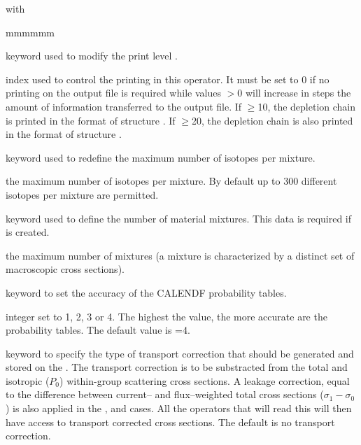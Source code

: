 \noindent
with
\begin{ListeDeDescription}{mmmmmm}

\item[\moc{EDIT}] keyword used to modify the print level .

\item[\dusa{iprint}] index used to control the printing in this operator. It
must be set to 0 if no printing on the output file is required while values
$>$0 will increase in steps the amount of information transferred to the output
file. If $\ge$10, the depletion chain is printed in the format of
structure . If $\ge$20, the depletion chain is also
printed in the format of structure .

\item[\moc{MXIS}] keyword used to redefine the maximum number of isotopes per
mixture.  

\item[\dusa{nmisot}] the maximum number of isotopes per
mixture. By default up to 300 different isotopes per mixture are permitted.

\item[\moc{NMIX}] keyword used to define the number of material mixtures. This
data is required if  is created.

\item[\dusa{nmixt}] the maximum number of mixtures (a mixture
is characterized by a distinct set of macroscopic cross sections). 

\item[\moc{CALENDF}] keyword to set the accuracy of the CALENDF probability
tables.

\item[\dusa{ipreci}] integer set to 1, 2, 3 or 4. The highest the value, the
more accurate are the probability tables. The default value is =4.

\item[\moc{CTRA}] keyword to specify the type of transport correction that
should be generated and stored on the . The transport correction is to be
substracted from the total and isotropic ($P_0$) within-group scattering cross sections. A leakage correction, equal 
to the difference between current-- and flux--weighted total cross sections ($\sigma_{1}-\sigma_{0}$)
is also applied in the ,  and  cases. All the operators that
will read this  will then have access to transport corrected
cross sections. The default is no transport correction.


\end{ListeDeDescription}
